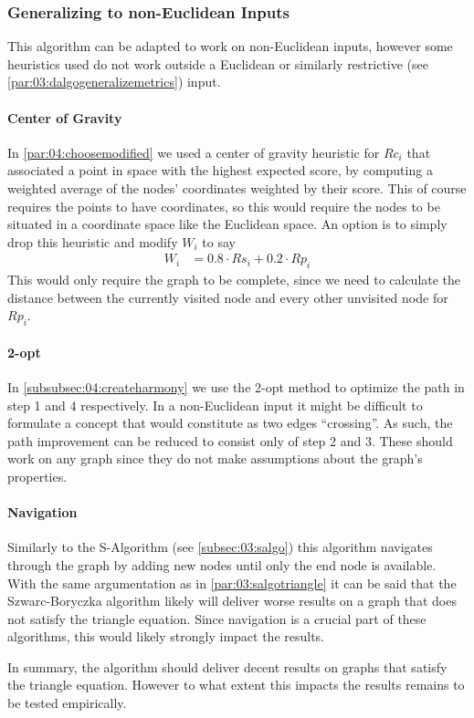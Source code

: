 \subsubsection{Generalizing to non-Euclidean Inputs}

This algorithm can be adapted to work on non-Euclidean inputs, however some heuristics used do not work outside a Euclidean or similarly restrictive (see \cref{par:03:dalgogeneralizemetrics}) input.

\paragraph{Center of Gravity}
In \cref{par:04:choosemodified} we used a center of gravity heuristic for $Rc_i$ that associated a point in space with the highest expected score,
by computing a weighted average of the nodes' coordinates weighted by their score.
This of course requires the points to have coordinates, so this would require the nodes to be situated in a coordinate space like the Euclidean space.
An option is to simply drop this heuristic and modify $W_i$ to say
\begin{align*}
  W_i &= 0.8 \cdot Rs_i + 0.2 \cdot Rp_i
\end{align*}
This would only require the graph to be complete, since we need to calculate the distance between the currently visited node and every other unvisited node for $Rp_i$.

\paragraph{2-opt}
In \cref{subsubsec:04:createharmony} we use the 2-opt method \cite{croes_method_1958} to optimize the path in step 1 and 4 respectively.
In a non-Euclidean input it might be difficult to formulate a concept that would constitute as two edges \enquote{crossing}.
As such, the path improvement can be reduced to consist only of step 2 and 3.
These should work on any graph since they do not make assumptions about the graph's properties.

\paragraph{Navigation}
Similarly to the S-Algorithm (see \cref{subsec:03:salgo}) this algorithm navigates through the graph by adding new nodes until only the end node is available.
With the same argumentation as in \cref{par:03:salgotriangle} it can be said that the Szwarc-Boryczka algorithm likely will deliver worse results on a graph that does not satisfy the triangle equation.
Since navigation is a crucial part of these algorithms, this would likely strongly impact the results.

In summary, the algorithm should deliver decent results on graphs that satisfy the triangle equation. 
However to what extent this impacts the results remains to be tested empirically.
